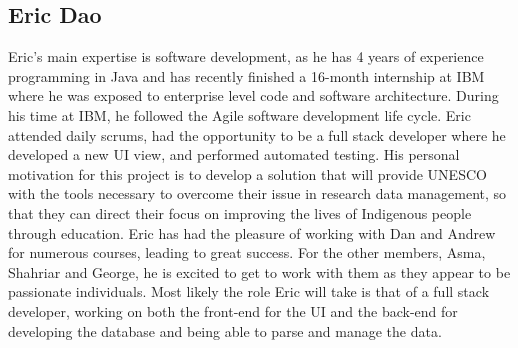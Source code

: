 \documentclass[11pt]{article}
\begin{document}
\subsection{\textbf{Eric Dao}}
Eric's main expertise is software development, as he has 4 years of experience programming in Java and has recently finished a 16-month internship at IBM where he was exposed to enterprise level code and software architecture. During his time at IBM, he followed the Agile software development life cycle. Eric attended daily scrums, had the opportunity to be a full stack developer where he developed a new UI view, and performed automated testing. His personal motivation for this project is to develop a solution that will provide UNESCO with the tools necessary to overcome their issue in research data management, so that they can direct their focus on improving the lives of Indigenous people through education. Eric has had the pleasure of working with Dan and Andrew for numerous courses, leading to great success. For the other members, Asma, Shahriar and George, he is excited to get to work with them as they appear to be passionate individuals. Most likely the role Eric will take is that of a full stack developer, working on both the front-end for the UI and the back-end for developing the database and being able to parse and manage the data. \\
\end{document}
